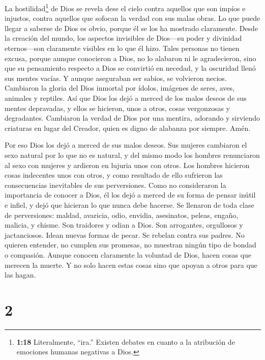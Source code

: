  La hostilidad\footnote{\textbf{1:18} Literalmente,
  ``ira.'' Existen debates en cuanto a la atribución de emociones
  humanas negativas a Dios.} de Dios se revela dese el cielo contra
aquellos que son impíos e injustos, contra aquellos que sofocan la
verdad con sus malas obras.  Lo que puede llegar a saberse
de Dios es obvio, porque él se los ha mostrado claramente. 
Desde la creación del mundo, los aspectos invisibles de Dios---su poder
y divinidad eternos---son claramente visibles en lo que él hizo. Tales
personas no tienen excusa,  porque aunque conocieron a
Dios, no lo alabaron ni le agradecieron, sino que su pensamiento
respecto a Dios se convirtió en necedad, y la oscuridad llenó sus mentes
vacías.  Y aunque aseguraban ser sabios, se volvieron
necios.  Cambiaron la gloria del Dios inmortal por ídolos,
imágenes de seres, aves, animales y reptiles.  Así que Dios
los dejó a merced de los malos deseos de sus mentes depravadas, y ellos
se hicieron, unos a otros, cosas vergonzosas y degradantes.
 Cambiaron la verdad de Dios por una mentira, adorando y
sirviendo criaturas en lugar del Creador, quien es digno de alabanza por
siempre. Amén.

 Por eso Dios los dejó a merced de sus malos deseos. Sus
mujeres cambiaron el sexo natural por lo que no es natural,
 y del mismo modo los hombres renunciaron al sexo con
mujeres y ardieron en lujuria unos con otros. Los hombres hicieron cosas
indecentes unos con otros, y como resultado de ello sufrieron las
consecuencias inevitables de sus perversiones.  Como no
consideraron la importancia de conocer a Dios, él los dejó a merced de
su forma de pensar inútil e infiel, y dejó que hicieran lo que nunca
debe hacerse.  Se llenaron de toda clase de perversiones:
maldad, avaricia, odio, envidia, asesinatos, peleas, engaño, malicia, y
chisme.  Son traidores y odian a Dios. Son arrogantes,
orgullosos y jactanciosos. Idean nuevas formas de pecar. Se rebelan
contra sus padres.  No quieren entender, no cumplen sus
promesas, no muestran ningún tipo de bondad o compasión. 
Aunque conocen claramente la voluntad de Dios, hacen cosas que merecen
la muerte. Y no solo hacen estas cosas sino que apoyan a otros para que
las hagan.

\hypertarget{section-1}{%
\section{2}\label{section-1}}

